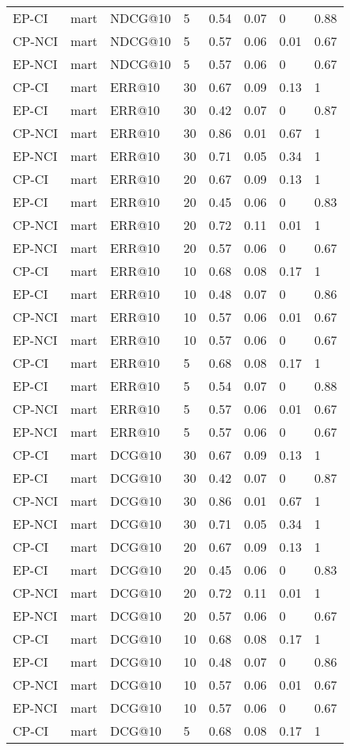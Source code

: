 \begin{landscape}
\begin{longtable}{|*{8}{l|}}
EP-CI&mart&NDCG@10&5&0.54&0.07&0&0.88\\
CP-NCI&mart&NDCG@10&5&0.57&0.06&0.01&0.67\\
EP-NCI&mart&NDCG@10&5&0.57&0.06&0&0.67\\
\hline
CP-CI&mart&ERR@10&30&0.67&0.09&0.13&1\\
EP-CI&mart&ERR@10&30&0.42&0.07&0&0.87\\
CP-NCI&mart&ERR@10&30&0.86&0.01&0.67&1\\
EP-NCI&mart&ERR@10&30&0.71&0.05&0.34&1\\
\hline
CP-CI&mart&ERR@10&20&0.67&0.09&0.13&1\\
EP-CI&mart&ERR@10&20&0.45&0.06&0&0.83\\
CP-NCI&mart&ERR@10&20&0.72&0.11&0.01&1\\
EP-NCI&mart&ERR@10&20&0.57&0.06&0&0.67\\
\hline
CP-CI&mart&ERR@10&10&0.68&0.08&0.17&1\\
EP-CI&mart&ERR@10&10&0.48&0.07&0&0.86\\
CP-NCI&mart&ERR@10&10&0.57&0.06&0.01&0.67\\
EP-NCI&mart&ERR@10&10&0.57&0.06&0&0.67\\
\hline
CP-CI&mart&ERR@10&5&0.68&0.08&0.17&1\\
EP-CI&mart&ERR@10&5&0.54&0.07&0&0.88\\
CP-NCI&mart&ERR@10&5&0.57&0.06&0.01&0.67\\
EP-NCI&mart&ERR@10&5&0.57&0.06&0&0.67\\
\hline
CP-CI&mart&DCG@10&30&0.67&0.09&0.13&1\\
EP-CI&mart&DCG@10&30&0.42&0.07&0&0.87\\
CP-NCI&mart&DCG@10&30&0.86&0.01&0.67&1\\
EP-NCI&mart&DCG@10&30&0.71&0.05&0.34&1\\
\hline
CP-CI&mart&DCG@10&20&0.67&0.09&0.13&1\\
EP-CI&mart&DCG@10&20&0.45&0.06&0&0.83\\
CP-NCI&mart&DCG@10&20&0.72&0.11&0.01&1\\
EP-NCI&mart&DCG@10&20&0.57&0.06&0&0.67\\
\hline
CP-CI&mart&DCG@10&10&0.68&0.08&0.17&1\\
EP-CI&mart&DCG@10&10&0.48&0.07&0&0.86\\
CP-NCI&mart&DCG@10&10&0.57&0.06&0.01&0.67\\
EP-NCI&mart&DCG@10&10&0.57&0.06&0&0.67\\
\hline
CP-CI&mart&DCG@10&5&0.68&0.08&0.17&1\\

\end{longtable}
\end{landscape}
